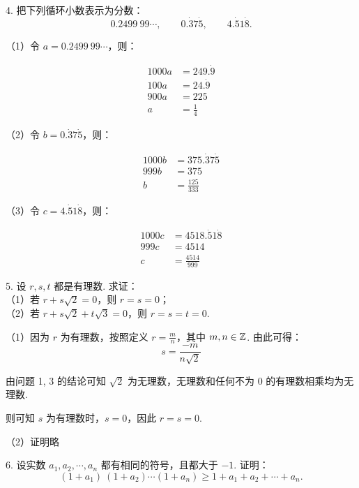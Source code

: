 \documentclass[12pt, a4paper, oneside, UTF8]{ctexbook}
\begin{document}
4. 把下列循环小数表示为分数：
\[ 0.2499\ 99\cdots,\qquad0.\dot{3}7\dot{5},\qquad4.\dot{5}1\dot{8} \text{.} \]

\begin{solution}
（1）令 $a = 0.2499\ 99\cdots$，则：

\begin{align*}
    1000a & = 249.\dot{9}\\
    100a & = 24.\dot{9}\\
    900a & = 225\\
    a & = \frac{1}{4}
\end{align*}

（2）令 $b = 0.\dot{3}7\dot{5}$，则：

\begin{align*}
    1000b & = 375.\dot{3}7\dot{5}\\
    999b & = 375\\
    b & = \frac{125}{333}
\end{align*}

（3）令 $c = 4.\dot{5}1\dot{8}$，则：

\begin{align*}
    1000c & = 4518.\dot{5}1\dot{8}\\
    999c & = 4514\\
    c & = \frac{4514}{999}
\end{align*}
\end{solution}

5. 设 $r, s, t$ 都是有理数. 求证：\\
\indent（1）若 $r + s\sqrt{2} = 0$，则 $r = s = 0$；\\
\indent（2）若 $r + s\sqrt{2} + t\sqrt{3} = 0$，则 $r = s = t = 0$.

\begin{solution}
（1）因为 $r$ 为有理数，按照定义 $\displaystyle r = \frac{m}{n}$，其中 $m, n \in \mathbb{Z}$. 由此可得：
\[s = \frac{-m}{n\sqrt{2}}\]

由问题 1, 3 的结论可知 $\sqrt{2}$ 为无理数，无理数和任何不为 $0$ 的有理数相乘均为无理数.

则可知 $s$ 为有理数时，$s = 0$，因此 $r = s = 0$.

（2）证明略
\end{solution}

6. 设实数 $a_1, a_2, \cdots, a_n$ 都有相同的符号，且都大于 $-1$. 证明：
\[ (1 + a_1)\ (1 + a_2) \cdots (1 + a_n) \geq 1 + a_1 + a_2 + \cdots + a_n \text{.} \]
\end{document}
